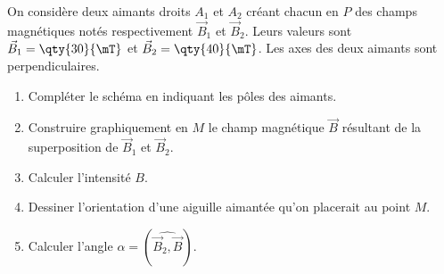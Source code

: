 \begin{minipage}{0.63\linewidth}
    On considère deux aimants droits $A_1$ et $A_2$ créant chacun en $P$ des champs
    magnétiques notés respectivement $\vec{B}_1$ et
    $\vec{B}_2$. Leurs valeurs sont $\vec{B}_1=\qty{30}{\mT}$ et
    $\vec{B}_2=\qty{40}{\mT}$. Les axes des deux aimants sont perpendiculaires.
    \begin{enumerate}
        \item Compléter le schéma en indiquant les pôles des aimants.
        \item Construire graphiquement en $M$ le champ magnétique $\vec{B}$
              résultant de la superposition de $\vec{B}_1$ et $\vec{B}_2$.
        \item Calculer l'intensité $B$.
        \item Dessiner l'orientation d'une aiguille aimantée qu'on placerait au
              point $M$.
        \item Calculer l'angle $\alpha=\left(\widehat{\vec{B}_2,\vec{B}}\right)$.
    \end{enumerate}
\end{minipage}
\hfill
\begin{minipage}{0.35\linewidth}
    \flushright
\end{minipage}

